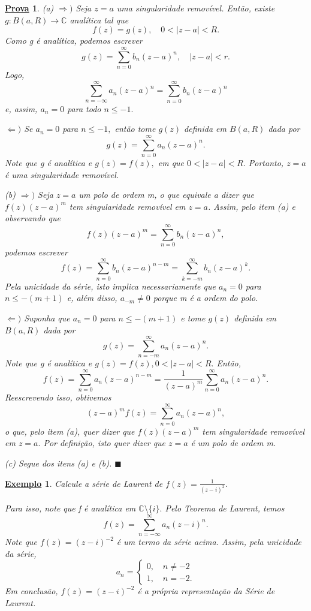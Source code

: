 \documentclass{article}
\newtheorem{example}{\underline{Exemplo}}[section]
\newtheorem*{proof*}{\underline{Prova}}
\renewcommand\qedsymbol{$\blacksquare$}
\begin{document}
  \begin{proof*}
    (a) \(\Rightarrow )\) Seja \(z=a\) uma singularidade removível. Então, existe \(g:B(a, R)\rightarrow \mathbb{C}\) analítica tal que 
    \[
      f(z) = g(z),\quad 0<|z-a|<R.
    \]
    Como g é analítica, podemos escrever 
    \[
      g(z) = \sum\limits_{n=0}^{\infty}b_{n}(z-a)^{n},\quad |z-a| < r.
    \]
    Logo,
    \[
      \sum\limits_{n=-\infty}^{\infty}a_{n}(z-a)^{n} = \sum\limits_{n=0}^{\infty}b_{n}(z-a)^{n}
    \]
    e, assim, \(a_{n}=0\) para todo \(n\leq -1.\)

    \(\Leftarrow )\) Se \(a_{n}=0\) para \(n\leq -1,\) então tome \(g(z)\) definida em \(B(a, R)\) dada por 
    \[
      g(z) = \sum\limits_{n=0}^{\infty}a_{n}(z-a)^{n}.
    \]
    Note que g é analítica e \(g(z) = f(z),\) em que \(0 < |z-a| < R.\) Portanto, \(z=a\) é uma singularidade removível.

    (b) \(\Rightarrow )\) Seja \(z=a\) um polo de ordem m, o que equivale a dizer que \(f(z)(z-a)^{m}\) tem singularidade removível em \(z=a\).
    Assim, pelo item (a) e observando que 
    \[
      f(z)(z-a)^{m} = \sum\limits_{n=0}^{\infty}b_{n}(z-a)^{n},
    \]
    podemos escrever 
    \[
      f(z) = \sum\limits_{n=0}^{\infty}b_{n}(z-a)^{n-m} = \sum\limits_{k=-m}^{\infty}b_{n}(z-a)^{k}.
    \]
    Pela unicidade da série, isto implica necessariamente que \(a_{n}=0\) para \(n\leq -(m+1)\) e, além disso, \(a_{-m}\neq0\) porque
    m é a ordem do polo.

    \(\Leftarrow )\) Suponha que \(a_{n} = 0\) para \(n\leq -(m+1)\) e tome \(g(z)\) definida em \(B(a, R)\) dada por 
    \[
      g(z) = \sum\limits_{n=-m}^{\infty}a_{n}(z-a)^{n}.
    \]
    Note que g é analítica e \(g(z) = f(z), 0 < |z-a| < R.\) Então,
    \[
      f(z) = \sum\limits_{n=0}^{\infty}a_{n}(z-a)^{n-m} = \frac{1}{(z-a)^{m}}\sum\limits_{n=0}^{\infty}a_{n}(z-a)^{n}.
    \]
    Reescrevendo isso, obtivemos 
    \[
      (z-a)^{m}f(z) = \sum\limits_{n=0}^{\infty}a_{n}(z-a)^{n},
    \]
    o que, pelo item (a), quer dizer que \(f(z)(z-a)^{m}\) tem singularidade removível em \(z=a.\) Por definição, isto quer dizer que 
    \(z=a\) é um polo de ordem m.

    (c) Segue dos itens (a) e (b). \qedsymbol
  \end{proof*}
  \begin{example}
    Calcule a série de Laurent de \(f(z) = \frac{1}{(z-i)^{2}}.\)

    Para isso, note que f é analítica em \(\mathbb{C}\setminus{\{i\}}.\) Pelo Teorema de Laurent, temos 
    \[
      f(z) = \sum\limits_{n=-\infty}^{\infty}a_{n}(z-i)^{n}.
    \]
    Note que \(f(z) = (z-i)^{-2}\) é um termo da série acima. Assim, pela unicidade da série,
    \[
      a_{n} = \left\{\begin{array}{ll}
          0,\quad n\neq-2\\
          1,\quad n = -2.
      \end{array}\right.
    \]
    Em conclusão, \(f(z) = (z-i)^{-2}\) é a própria representação da Série de Laurent.
  \end{example}
\end{document}
